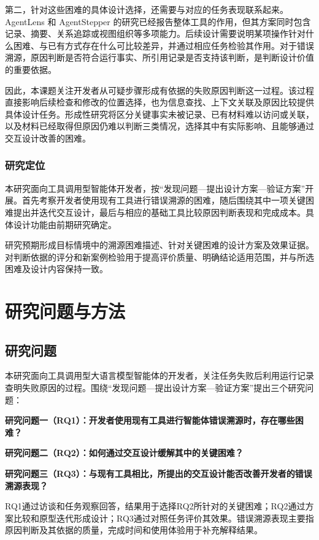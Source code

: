 第二，针对这些困难的具体设计选择，还需要与对应的任务表现联系起来。AgentLens 和 AgentStepper 的研究已经报告整体工具的作用，但其方案同时包含记录、摘要、关系追踪或视图组织等多项能力。后续设计需要说明某项操作针对什么困难、与已有方式存在什么可比较差异，并通过相应任务检验其作用。对于错误溯源，原因判断是否符合运行事实、所引用记录是否支持该判断，是判断设计价值的重要依据。

因此，本课题关注开发者从可疑步骤形成有依据的失败原因判断这一过程。该过程直接影响后续检查和修改的位置选择，也为信息查找、上下文关联及原因比较提供具体设计任务。形成性研究将区分关键事实未被记录、已有材料难以访问或关联，以及材料已经取得但原因仍难以判断三类情况，选择其中有实际影响、且能够通过交互设计改善的困难。

\subsubsection{研究定位}

本研究面向工具调用型智能体开发者，按“发现问题—提出设计方案—验证方案”开展。首先考察开发者使用现有工具进行错误溯源的困难，随后围绕其中一项关键困难提出并迭代交互设计，最后与相应的基础工具比较原因判断表现和完成成本。具体设计功能由前期研究确定。

研究预期形成目标情境中的溯源困难描述、针对关键困难的设计方案及效果证据。对判断依据的评分和新案例检验用于提高评价质量、明确结论适用范围，并与所选困难及设计内容保持一致。

\clearpage
\section{研究问题与方法}

\subsection{研究问题}

本研究面向工具调用型大语言模型智能体的开发者，关注任务失败后利用运行记录查明失败原因的过程。围绕“发现问题—提出设计方案—验证方案”提出三个研究问题：

\noindent\textbf{研究问题一（RQ1）：开发者使用现有工具进行智能体错误溯源时，存在哪些困难？}

\noindent\textbf{研究问题二（RQ2）：如何通过交互设计缓解其中的关键困难？}

\noindent\textbf{研究问题三（RQ3）：与现有工具相比，所提出的交互设计能否改善开发者的错误溯源表现？}

RQ1通过访谈和任务观察回答，结果用于选择RQ2所针对的关键困难；RQ2通过方案比较和原型迭代形成设计；RQ3通过对照任务评价其效果。错误溯源表现主要指原因判断及其依据的质量，完成时间和使用体验用于补充解释结果。


